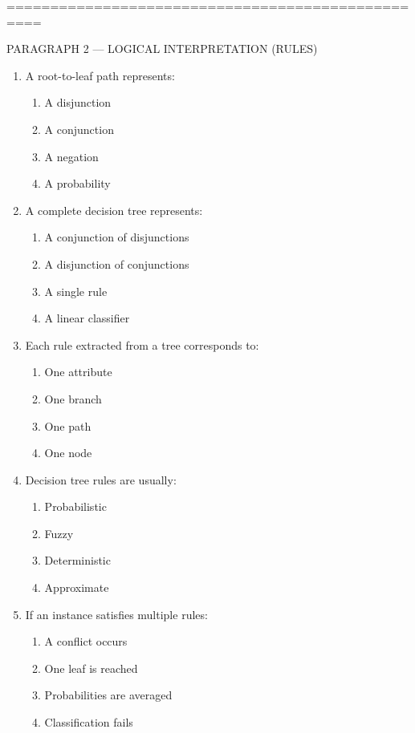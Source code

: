 \documentclass[3pt]{article}
\begin{document}
\vspace{0.3em}

	==================================================
	
	PARAGRAPH 2 — LOGICAL INTERPRETATION (RULES)
	
	\begin{enumerate}
		\item A root-to-leaf path represents:
		\begin{enumerate}
			\item A disjunction
			\item A conjunction
			\item A negation
			\item A probability
		\end{enumerate}
		
		\item A complete decision tree represents:
		\begin{enumerate}
			\item A conjunction of disjunctions
			\item A disjunction of conjunctions
			\item A single rule
			\item A linear classifier
		\end{enumerate}
		
		\item Each rule extracted from a tree corresponds to:
		\begin{enumerate}
			\item One attribute
			\item One branch
			\item One path
			\item One node
		\end{enumerate}
		
		\item Decision tree rules are usually:
		\begin{enumerate}
			\item Probabilistic
			\item Fuzzy
			\item Deterministic
			\item Approximate
		\end{enumerate}
		
		\item If an instance satisfies multiple rules:
		\begin{enumerate}
			\item A conflict occurs
			\item One leaf is reached
			\item Probabilities are averaged
			\item Classification fails
		\end{enumerate}
		

\end{enumerate}
\end{document}
